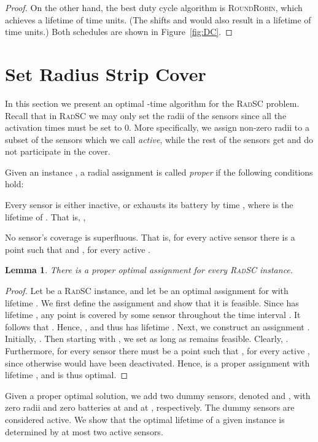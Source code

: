 \documentclass[11pt]{article}
\newtheorem{lemma}{Lemma}
\newcommand{\srsc}{\textsc{RadSC}\xspace}
\newcommand{\rr}{\textsc{RoundRobin}\xspace}
\begin{document}
\begin{proof}
On the other hand, the best duty cycle algorithm is \rr, which
achieves a lifetime of  time units.  (The shifts  and
 would also result in a lifetime of  time units.)
Both schedules are shown in Figure~\ref{fig:DC}.
\end{proof}




\section{Set Radius Strip Cover}
\label{sec:srsc}

In this section we present an optimal -time algorithm
for the \srsc problem.
Recall that in \srsc we may only set the radii of the sensors since
all the activation times must be set to 0.  More specifically, we
assign non-zero radii to a subset of the sensors which we call \emph{active}, while the rest of
the sensors get  and do not participate in the cover. 


Given an instance , a radial assignment  is called
\emph{proper} if the following conditions hold:
\begin{enumerate*}
\item Every sensor is either inactive, or exhausts its battery by 
      time , where  is the lifetime of . That is, ,
\item No sensor's coverage is superfluous. That is, for every active 
      sensor  there is a point  such that  and , for every active .
\end{enumerate*}

\begin{lemma}
\label{lemma:proper}
There is
a proper optimal assignment for every \srsc instance.
\end{lemma}
\begin{proof}Let  be a \srsc instance, and let  be an optimal
assignment for  with lifetime .  We first define the assignment
 and show that it is feasible.  Since  has lifetime
, any point  is covered by some sensor  throughout
the time interval .  It follows that .  Hence, , and thus 
has lifetime .
Next, we construct an assignment .  Initially, .
Then starting with , we set  as long as 
remains feasible.  Clearly, .  Furthermore,
for every sensor  there must be a point  such that , for every active , since
otherwise  would have been deactivated.  Hence,  is a
proper assignment with lifetime , and is thus optimal.
\end{proof}


Given a proper optimal solution, we add two dummy sensors, denoted 
and , with zero radii and zero batteries at  and at ,
respectively.  The dummy sensors are considered active.
We show that the optimal lifetime of a given instance is determined by
at most two active sensors.
\end{document}
